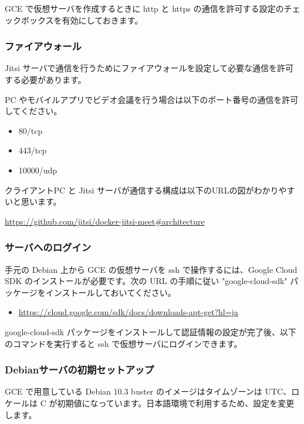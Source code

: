 \documentclass[mingoth,a4paper]{jsarticle}
\begin{document}
GCE で仮想サーバを作成するときに http と https の通信を許可する設定のチェックボックスを有効にしておきます。


\subsubsection{ファイアウォール}

Jitsi サーバで通信を行うためにファイアウォールを設定して必要な通信を許可する必要があります。

PC やモバイルアプリでビデオ会議を行う場合は以下のポート番号の通信を許可してください。

\begin{itemize}
\item 80/tcp
\item 443/tcp
\item 10000/udp
\end{itemize}

クライアントPC と Jitsi サーバが通信する構成は以下のURLの図がわかりやすいと思います。

\url{https://github.com/jitsi/docker-jitsi-meet#architecture}


\subsubsection{サーバへのログイン}

手元の Debian 上から GCE の仮想サーバを ssh で操作するには、Google Cloud SDK のインストールが必要です。次の URL の手順に従い "google-cloud-sdk" パッケージをインストールしておいてください。

\begin{itemize}
\item \url{https://cloud.google.com/sdk/docs/downloads-apt-get?hl=ja}
\end{itemize}

google-cloud-sdk パッケージをインストールして認証情報の設定が完了後、以下のコマンドを実行すると ssh で仮想サーバにログインできます。



\subsubsection{Debianサーバの初期セットアップ}

GCE で用意している Debian 10.3 buster のイメージはタイムゾーンは UTC、ロケールは C が初期値になっています。日本語環境で利用するため、設定を変更します。
\end{document}
